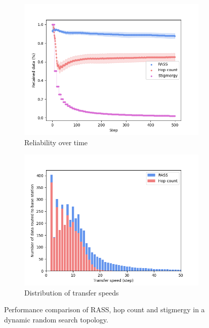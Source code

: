 \documentclass[runningheads]{llncs}
\begin{document}
\begin{figure}
    \centering
    \begin{subfigure}{0.49\textwidth}
        \includegraphics[width=\textwidth]{figures/random_reliability.png}
        \caption{Reliability over time}
        \label{results:random_100_reliability}
    \end{subfigure}
    \begin{subfigure}{0.49\textwidth}
        \includegraphics[width=\textwidth]{figures/random_speed.png}
        \caption{Distribution of transfer speeds}
        \label{results:random_100_speed}
    \end{subfigure}
    \caption{Performance comparison of RASS, hop count and stigmergy in a dynamic random search topology.}
    \label{results:dynamicTopologyRandom}
    \vspace{-2mm}
\end{figure}
\end{document}

